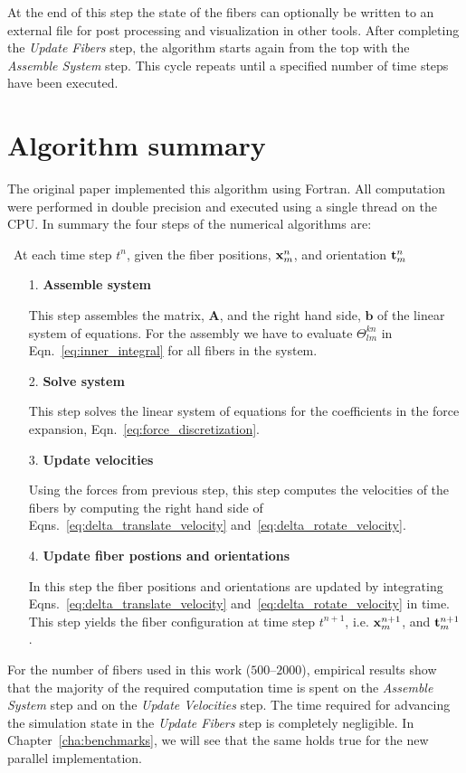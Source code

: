 At the end of this step the state of the fibers can optionally be written to an external file for post processing and visualization in other tools. After completing the \emph{Update Fibers} step, the algorithm starts again from the top with the \emph{Assemble System} step. This cycle repeats until a specified number of time steps have been executed.

\section{Algorithm summary}
\label{sec:algorithm_summary}

The original paper implemented this algorithm using Fortran. All computation were performed in double precision and executed using a single thread on the CPU. In summary the four steps of the numerical algorithms are:

~\linebreak[4]At each time step $t^n$, given the fiber positions, $\mathbf{x}_m^n$,  and
orientation $\mathbf{t}_m^n$

\begin{itemize}
\item[1.] {\textbf{Assemble system}}

This step assembles the matrix, $\mathbf{A}$, and the right hand side, $\mathbf{b}$ of the linear system of equations. For the assembly we have to
evaluate $\Theta_{lm}^{kn}$ in Eqn.~\eqref{eq:inner_integral} for all fibers in the
system.
\item[2.] {\textbf{Solve system}} 

This step solves the linear system of equations for the coefficients in the force expansion, Eqn.~\eqref{eq:force_discretization}.
\item[3.] {\textbf{Update velocities}}

Using the forces from previous step, this step computes the velocities of the fibers by computing the right hand side of Eqns.~\eqref{eq:delta_translate_velocity} and~\eqref{eq:delta_rotate_velocity}. 
\item[4.] {\textbf{Update fiber postions and orientations}}

In this step the fiber positions and orientations are updated by integrating Eqns.~\eqref{eq:delta_translate_velocity} and~\eqref{eq:delta_rotate_velocity} in time. This step yields the fiber configuration at time step $t^{n+1}$, i.e. $\mathbf{x}_m^{n+1}$,  and $\mathbf{t}_m^{n+1}$. 
\end{itemize}

For the number of fibers used in this work ($500–2000$), empirical results show that the majority of the required computation time is spent on the \emph{Assemble System} step and on the \emph{Update Velocities} step. The time required for advancing the simulation state in the \emph{Update Fibers} step is completely negligible. In Chapter~\ref{cha:benchmarks}, we will see that the same holds true for the new parallel implementation.

